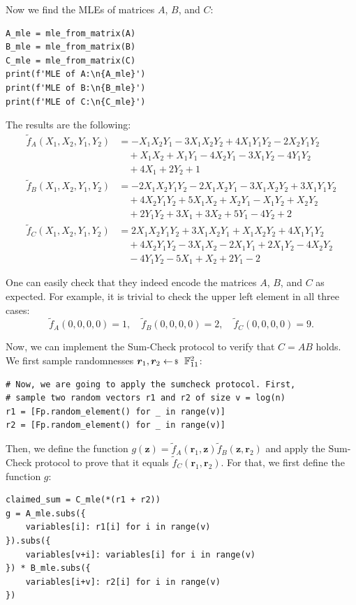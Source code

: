 \documentclass[../../book.tex]{subfiles}
\begin{document}
Now we find the MLEs of matrices $A$, $B$, and $C$:
\begin{verbatim}
A_mle = mle_from_matrix(A)
B_mle = mle_from_matrix(B)
C_mle = mle_from_matrix(C)
print(f'MLE of A:\n{A_mle}')
print(f'MLE of B:\n{B_mle}')
print(f'MLE of C:\n{C_mle}')
\end{verbatim}

The results are the following:
\begin{align*}
\widetilde{f}_A(X_1,X_2,Y_1,Y_2) &= -X_1X_2Y_1 - 3X_1X_2Y_2 + 4X_1Y_1Y_2 - 2X_2Y_1Y_2 \\
& \quad + X_1X_2 + X_1Y_1 - 4X_2Y_1 - 3X_1Y_2 - 4Y_1Y_2 \\
& \quad + 4X_1 + 2Y_2 + 1 \\
\widetilde{f}_B(X_1,X_2,Y_1,Y_2) &= -2X_1X_2Y_1Y_2 - 2X_1X_2Y_1 - 3X_1X_2Y_2 + 3X_1Y_1Y_2 \\
& \quad + 4X_2Y_1Y_2 + 5X_1X_2 + X_2Y_1 - X_1Y_2 + X_2Y_2 \\
& \quad + 2Y_1Y_2 + 3X_1 + 3X_2 + 5Y_1 - 4Y_2 + 2 \\
\widetilde{f}_C(X_1,X_2,Y_1,Y_2) &= 2X_1X_2Y_1Y_2 + 3X_1X_2Y_1 + X_1X_2Y_2 + 4X_1Y_1Y_2 \\
& \quad + 4X_2Y_1Y_2 - 3X_1X_2 - 2X_1Y_1 + 2X_1Y_2 - 4X_2Y_2 \\
& \quad - 4Y_1Y_2 - 5X_1 + X_2 + 2Y_1 - 2
\end{align*}

One can easily check that they indeed encode the matrices $A$, $B$, and $C$ as
expected. For example, it is trivial to check the upper left element in all 
three cases:
\begin{equation*}
    \widetilde{f}_A(0,0,0,0) = 1, \quad \widetilde{f}_B(0,0,0,0) = 2, \quad \widetilde{f}_C(0,0,0,0) = 9.
\end{equation*}

Now, we can implement the Sum-Check protocol to verify that $C = AB$ holds. We
first sample randomnesses $\boldsymbol{r}_1, \boldsymbol{r}_2 \leftarrowS
\mathbb{F}_{11}^2$:
\begin{verbatim}
# Now, we are going to apply the sumcheck protocol. First, 
# sample two random vectors r1 and r2 of size v = log(n)
r1 = [Fp.random_element() for _ in range(v)]
r2 = [Fp.random_element() for _ in range(v)]
\end{verbatim}

Then, we define the function $g(\mathbf{z}) = \widetilde{f}_A(\boldsymbol{r}_1,
\mathbf{z})\widetilde{f}_B(\mathbf{z}, \boldsymbol{r}_2)$ and apply the
Sum-Check protocol to prove that it equals $\widetilde{f}_C(\boldsymbol{r}_1,
\boldsymbol{r}_2)$. For that, we first define the function $g$:
\begin{verbatim}
claimed_sum = C_mle(*(r1 + r2))
g = A_mle.subs({
    variables[i]: r1[i] for i in range(v)
}).subs({
    variables[v+i]: variables[i] for i in range(v)
}) * B_mle.subs({
    variables[i+v]: r2[i] for i in range(v)
})
\end{verbatim}
\end{document}
